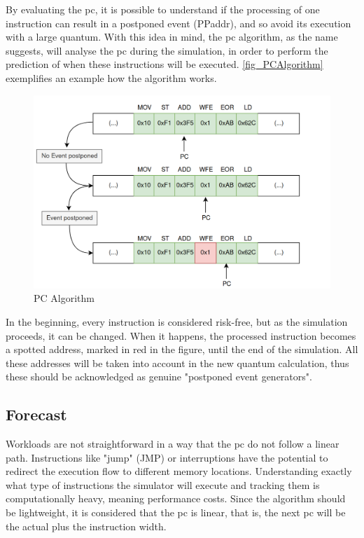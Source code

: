 By evaluating the \gls{pc}, it is possible to understand if the processing of one instruction can result in a postponed event (PPaddr), and so avoid its execution with a large quantum. With this idea in mind, the \gls{pc} algorithm, as the name suggests, will analyse the \gls{pc} during the simulation, in order to perform the prediction of when these instructions will be executed. \autoref{fig_PCAlgorithm} exemplifies an example how the algorithm works.

\begin{figure}[h!]
	\centering
 	\includegraphics[width=0.7\linewidth]{Images/PCAlgorithm.png}
 	\caption{PC Algorithm}
	 \label{fig_PCAlgorithm}
\end{figure}

In the beginning, every instruction is considered risk-free, but as the simulation proceeds, it can be changed. When it happens, the processed instruction becomes a spotted address, marked in red in the figure, until the end of the simulation. All these addresses will be taken into account in the new quantum calculation, thus these should be acknowledged as genuine "postponed event generators".





 
\subsection{Forecast}

Workloads are not straightforward in a way that the \gls{pc} do not follow a linear path. Instructions like "jump" (JMP) or interruptions have the potential to redirect the execution flow to different memory locations. Understanding exactly what type of instructions the simulator will execute and tracking them is computationally heavy, meaning performance costs. Since the algorithm should be lightweight, it is considered that the \gls{pc} is linear, that is, the next \gls{pc} will be the actual plus the instruction width. 

